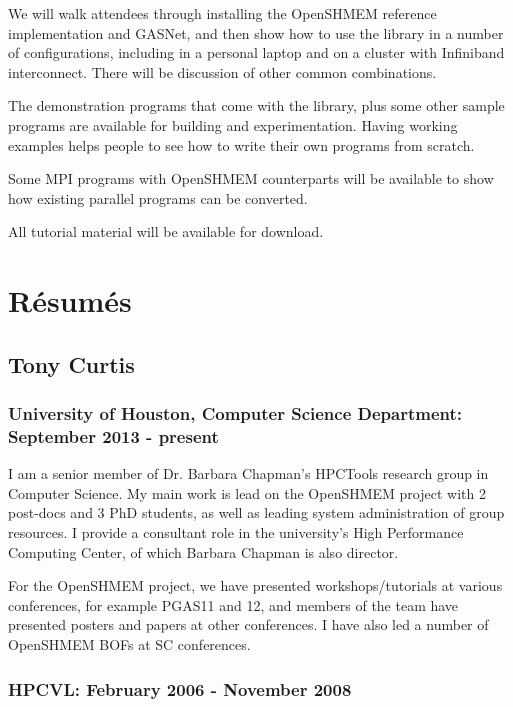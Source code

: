 \documentclass[10pt,english]{article}
\begin{document}
We will walk attendees through installing the OpenSHMEM reference
implementation and GASNet, and then show how to use the library in a
number of configurations, including in a personal laptop and on a
cluster with Infiniband interconnect.  There will be discussion of
other common combinations.

The demonstration programs that come with the library, plus some other
sample programs are available for building and experimentation.
Having working examples helps people to see how to write their own
programs from scratch.

Some MPI programs with OpenSHMEM counterparts will be available to
show how existing parallel programs can be converted.

All tutorial material will be available for download.

\section{R\'{e}sum\'{e}s}

\subsection{Tony Curtis}

\subsubsection*{University of Houston, Computer Science Department:
  September 2013 - present}

    I am a senior member of Dr. Barbara Chapman's HPCTools research
    group in Computer Science.  My main work is lead on the OpenSHMEM
    project with 2 post-docs and 3 PhD students, as well as leading
    system administration of group resources.  I provide a consultant
    role in the university's High Performance Computing Center, of
    which Barbara Chapman is also director.

    For the OpenSHMEM project, we have presented workshops/tutorials
    at various conferences, for example PGAS11 and 12, and members of
    the team have presented posters and papers at other conferences.
    I have also led a number of OpenSHMEM BOFs at SC conferences.

\subsubsection*{HPCVL:
  February 2006 - November 2008}
\end{document}
